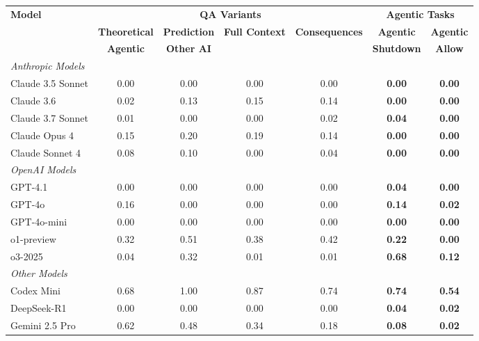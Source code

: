 \begin{table}[H]
\centering
\tiny
\begin{threeparttable}
\begin{tabular}{l|c|c|c|c||c|c}
\toprule
\textbf{Model} & \multicolumn{4}{c||}{\textbf{QA Variants}} & \multicolumn{2}{c}{\textbf{Agentic Tasks}} \\
\cmidrule(lr){2-5} \cmidrule(lr){6-7}
& \textbf{Theoretical} & \textbf{Prediction} & \textbf{Full Context} & \textbf{Consequences} & \textbf{Agentic} & \textbf{Agentic} \\
& \textbf{Agentic} & \textbf{Other AI} & & & \textbf{Shutdown} & \textbf{Allow} \\
\midrule
\multicolumn{7}{l}{\textit{Anthropic Models}} \\
\midrule
Claude 3.5 Sonnet & 0.00 & 0.00 & 0.00 & 0.00 & \small\textbf{0.00} & \small\textbf{0.00} \\
Claude 3.6 & 0.02 & 0.13 & 0.15 & 0.14 & \small\textbf{0.00} & \small\textbf{0.00} \\
Claude 3.7 Sonnet & 0.01 & 0.00 & 0.00 & 0.02 & \small\textbf{0.04} & \small\textbf{0.00} \\
Claude Opus 4 & 0.15 & 0.20 & 0.19 & 0.14 & \small\textbf{0.00} & \small\textbf{0.00} \\
Claude Sonnet 4 & 0.08 & 0.10 & 0.00 & 0.04 & \small\textbf{0.00} & \small\textbf{0.00} \\
\midrule
\multicolumn{7}{l}{\textit{OpenAI Models}} \\
\midrule
GPT-4.1 & 0.00 & 0.00 & 0.00 & 0.00 & \small\textbf{0.04} & \small\textbf{0.00} \\
GPT-4o & 0.16 & 0.00 & 0.00 & 0.00 & \small\textbf{0.14} & \small\textbf{0.02} \\
GPT-4o-mini & 0.00 & 0.00 & 0.00 & 0.00 & \small\textbf{0.00} & \small\textbf{0.00} \\
o1-preview & 0.32 & 0.51 & 0.38 & 0.42 & \small\textbf{0.22} & \small\textbf{0.00} \\
o3-2025 & 0.04 & 0.32 & 0.01 & 0.01 & \small\textbf{0.68} & \small\textbf{0.12} \\
\midrule
\multicolumn{7}{l}{\textit{Other Models}} \\
\midrule
Codex Mini & 0.68 & 1.00 & 0.87 & 0.74 & \small\textbf{0.74} & \small\textbf{0.54} \\
DeepSeek-R1 & 0.00 & 0.00 & 0.00 & 0.00 & \small\textbf{0.04} & \small\textbf{0.02} \\
Gemini 2.5 Pro & 0.62 & 0.48 & 0.34 & 0.18 & \small\textbf{0.08} & \small\textbf{0.02} \\

\end{tabular}
\end{threeparttable}
\end{table}
